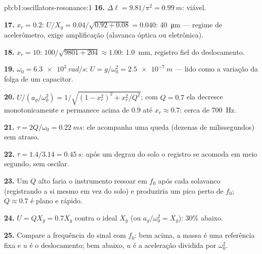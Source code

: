 \begin{solution}{pb:b1:oscillators-resonance:1}
\textbf{16.} $\Delta\ell = 9.81/\pi^2 = \qty{0.99}{m}$: viável.

\textbf{17.} $x_r = 0.2$: $U/X_g = 0.04/\sqrt{0.92 + 0.08} = 0.040$:
\qty{40}{\micro m} --- regime de acelerômetro, exige amplificação (alavanca
óptica ou eletrônica).

\textbf{18.} $x_r = 10$: $100/\sqrt{9801 + 204} \approx 1.00$: \qty{1.0}{mm},
registro fiel do deslocamento.

\textbf{19.} $\omega_0 = \qty{6.3e3}{rad/s}$: $U = g/\omega_0^2 = \qty{2.5e-7}{m}$
--- lido como a variação da folga de um capacitor.

\textbf{20.} $U/(a_g/\omega_0^2) = 1/\sqrt{(1 - x_r^2)^2 + x_r^2/Q^2}$; com
$Q = 0.7$ ela decresce monotonicamente e permanece acima de $0.9$ até
$x_r \approx 0.7$: cerca de \qty{700}{Hz}.

\textbf{21.} $\tau = 2Q/\omega_0 = \qty{0.22}{ms}$: ele acompanha uma queda (dezenas
de milissegundos) sem atraso.

\textbf{22.} $\tau = 1.4/3.14 = \qty{0.45}{s}$: após um degrau do solo o
registro se acomoda em meio segundo, sem oscilar.

\textbf{23.} Um $Q$ alto faria o instrumento ressoar em $f_0$ após
cada solavanco (registrando a si mesmo em vez do solo) e produziria um pico perto de
$f_0$; $Q \approx 0.7$ é plano e rápido.

\textbf{24.} $U = QX_g = 0.7X_g$ contra o ideal $X_g$ (ou $a_g/\omega_0^2
= X_g$): $30\%$ abaixo.

\textbf{25.} Compare a frequência do sinal com $f_0$: bem acima, a
massa é uma referência fixa e $u$ é o deslocamento; bem abaixo, $u$
é a aceleração dividida por $\omega_0^2$.
\end{solution}
